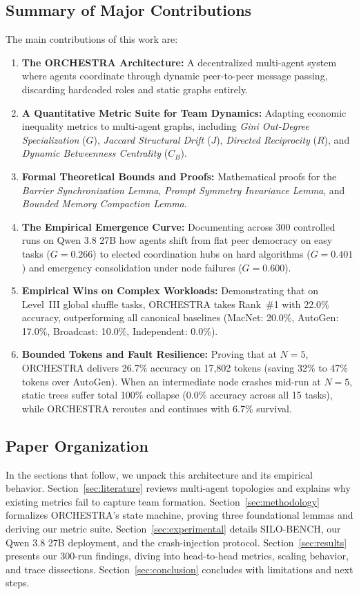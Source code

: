 \documentclass{ieeeaccess}
\begin{document}
\subsection{Summary of Major Contributions}
The main contributions of this work are:
\begin{enumerate}
    \item \textbf{The ORCHESTRA Architecture:} A decentralized multi-agent system where agents coordinate through dynamic peer-to-peer message passing, discarding hardcoded roles and static graphs entirely.
    \item \textbf{A Quantitative Metric Suite for Team Dynamics:} Adapting economic inequality metrics to multi-agent graphs, including \textit{Gini Out-Degree Specialization} ($G$), \textit{Jaccard Structural Drift} ($J$), \textit{Directed Reciprocity} ($R$), and \textit{Dynamic Betweenness Centrality} ($C_B$).
    \item \textbf{Formal Theoretical Bounds and Proofs:} Mathematical proofs for the \textit{Barrier Synchronization Lemma}, \textit{Prompt Symmetry Invariance Lemma}, and \textit{Bounded Memory Compaction Lemma}.
    \item \textbf{The Empirical Emergence Curve:} Documenting across 300 controlled runs on Qwen 3.8 27B how agents shift from flat peer democracy on easy tasks ($G=0.266$) to elected coordination hubs on hard algorithms ($G=0.401$) and emergency consolidation under node failures ($G=0.600$).
    \item \textbf{Empirical Wins on Complex Workloads:} Demonstrating that on Level~III global shuffle tasks, ORCHESTRA takes Rank~\#1 with 22.0\% accuracy, outperforming all canonical baselines (MacNet: 20.0\%, AutoGen: 17.0\%, Broadcast: 10.0\%, Independent: 0.0\%).
    \item \textbf{Bounded Tokens and Fault Resilience:} Proving that at $N=5$, ORCHESTRA delivers 26.7\% accuracy on 17,802 tokens (saving 32\% to 47\% tokens over AutoGen). When an intermediate node crashes mid-run at $N=5$, static trees suffer total 100\% collapse (0.0\% accuracy across all 15 tasks), while ORCHESTRA reroutes and continues with 6.7\% survival.
\end{enumerate}

\subsection{Paper Organization}
In the sections that follow, we unpack this architecture and its empirical behavior. Section~\ref{sec:literature} reviews multi-agent topologies and explains why existing metrics fail to capture team formation. Section~\ref{sec:methodology} formalizes ORCHESTRA's state machine, proving three foundational lemmas and deriving our metric suite. Section~\ref{sec:experimental} details SILO-BENCH, our Qwen 3.8 27B deployment, and the crash-injection protocol. Section~\ref{sec:results} presents our 300-run findings, diving into head-to-head metrics, scaling behavior, and trace dissections. Section~\ref{sec:conclusion} concludes with limitations and next steps.
\end{document}

